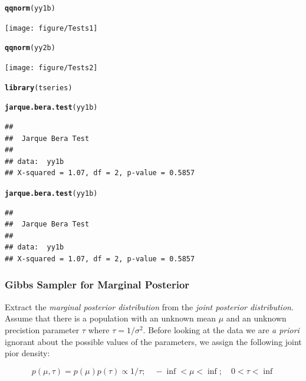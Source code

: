 \documentclass[12pt, a4paper, oneside]{article}\usepackage{graphicx, color}
\makeatletter
\newcommand{\hlfunctioncall}[1]{\textcolor[rgb]{0.501960784313725,0,0.329411764705882}{\textbf{#1}}}%
\newenvironment{kframe}{%
 \def\at@end@of@kframe{}%
 \ifinner\ifhmode%
  \def\at@end@of@kframe{\end{minipage}}%
  \begin{minipage}{\columnwidth}%
 \fi\fi%
 \def\FrameCommand##1{\hskip\@totalleftmargin \hskip-\fboxsep
 \colorbox{shadecolor}{##1}\hskip-\fboxsep
     \hskip-\linewidth \hskip-\@totalleftmargin \hskip\columnwidth}%
 \MakeFramed {\advance\hsize-\width
   \@totalleftmargin\z@ \linewidth\hsize
   \@setminipage}}%
 {\par\unskip\endMakeFramed%
 \at@end@of@kframe}
\newenvironment{knitrout}{}{} %
\makeatother
\begin{document}
\begin{knitrout}
\color{fgcolor}\begin{kframe}
\begin{alltt}
\hlfunctioncall{qqnorm}(yy1b)
\end{alltt}
\end{kframe}
\texttt{[image: figure/Tests1]} 
\begin{kframe}\begin{alltt}
\hlfunctioncall{qqnorm}(yy2b)
\end{alltt}
\end{kframe}
\texttt{[image: figure/Tests2]} 
\begin{kframe}\begin{alltt}
\hlfunctioncall{library}(tseries)
\end{alltt}


{\ttfamily\noindent\color{warningcolor}{\#\# Warning: package 'tseries' was built under R version 3.0.3}}\begin{alltt}
\hlfunctioncall{jarque.bera.test}(yy1b)
\end{alltt}
\begin{verbatim}
## 
## 	Jarque Bera Test
## 
## data:  yy1b
## X-squared = 1.07, df = 2, p-value = 0.5857
\end{verbatim}
\begin{alltt}
\hlfunctioncall{jarque.bera.test}(yy1b)
\end{alltt}
\begin{verbatim}
## 
## 	Jarque Bera Test
## 
## data:  yy1b
## X-squared = 1.07, df = 2, p-value = 0.5857
\end{verbatim}
\end{kframe}
\end{knitrout}


\subsubsection{Gibbs Sampler for Marginal Posterior}
Extract the \emph{marginal posterior distribution} from the \emph{joint posterior distribution}. Assume that there is a population with an unknown mean $\mu$ and an unknown precistion parameter $\tau$ where $\tau = 1/\sigma^2$. Before looking at the data we are \emph{a priori} ignorant about the possible values of the parameters, we assign the following joint pior density: 

\begin{equation}
p(\mu, \tau) = p(\mu) p(\tau) \propto 1/\tau ; \quad -\inf < \mu < \inf ; \quad 0 < \tau < \inf
\end{equation}
\end{document}
